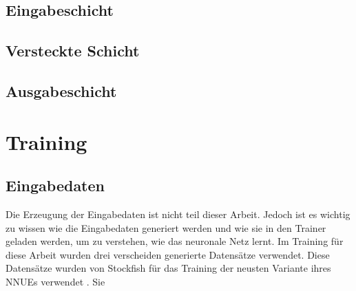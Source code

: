 

\subsection{Eingabeschicht}


\subsection{Versteckte Schicht}
\subsection{Ausgabeschicht}


\section{Training}

\subsection{Eingabedaten}

Die Erzeugung der Eingabedaten ist nicht teil dieser Arbeit. Jedoch ist es wichtig zu wissen wie die Eingabedaten generiert werden und wie sie in den Trainer geladen werden, um zu verstehen, wie das neuronale Netz lernt. Im Training für diese Arbeit wurden drei verscheiden generierte Datensätze verwendet. Diese Datensätze wurden von Stockfish für das Training der neusten Variante ihres \acp{NNUE} verwendet \cite{StockfishNewestNetJul04}. Sie 



